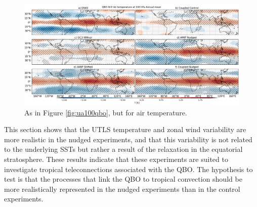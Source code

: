 \begin{figure}[t!]
\centering
 \includegraphics[width=\linewidth]{figures/ta100climqbowf.png}
\caption[Zonal wind QBO W-E difference 100 hPa level]{As in Figure \ref{fig:ua100qbo}, but for air temperature. }
\label{fig:ta100qbo}
\end{figure}

This section shows that the UTLS temperature and zonal wind variability are more realistic in the nudged experiments, and that this variability is not related to the underlying SSTs but rather a result of the relaxation in the equatorial stratosphere. These results indicate that these experiments are suited to investigate tropical teleconnections associated with the QBO. The hypothesis to test is that the processes that link the QBO to tropical convection should be more realistically represented in the nudged experiments than in the control experiments. %

